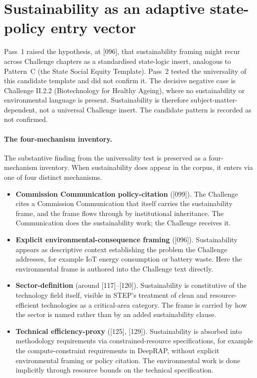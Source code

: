 \section{Sustainability as an adaptive state-policy entry vector}
\label{sec:res-sustainability}

Pass~1 raised the hypothesis, at [096], that sustainability framing
might recur across Challenge chapters as a standardised state-logic
insert, analogous to Pattern~C (the State Social Equity Template).
Pass~2 tested the universality of this candidate template and did not
confirm it. The decisive negative case is Challenge II.2.2
(Biotechnology for Healthy Ageing), where no sustainability or
environmental language is present. Sustainability is therefore
subject-matter-dependent, not a universal Challenge insert. The
candidate pattern is recorded as not confirmed.

\paragraph{The four-mechanism inventory.}
The substantive finding from the universality test is preserved as a
four-mechanism inventory. When sustainability does appear in the
corpus, it enters via one of four distinct mechanisms.

\begin{itemize}[leftmargin=*]
  \item \textbf{Commission Communication policy-citation} ([099]).
    The Challenge cites a Commission Communication that itself
    carries the sustainability frame, and the frame flows through by
    institutional inheritance. The Communication does the
    sustainability work; the Challenge receives it.
  \item \textbf{Explicit environmental-consequence framing} ([096]).
    Sustainability appears as descriptive context establishing the
    problem the Challenge addresses, for example IoT energy
    consumption or battery waste. Here the environmental frame is
    authored into the Challenge text directly.
  \item \textbf{Sector-definition} (around [117]--[120]).
    Sustainability is constitutive of the technology field itself,
    visible in STEP's treatment of clean and resource-efficient
    technologies as a critical-area category. The frame is carried
    by how the sector is named rather than by an added
    sustainability clause.
  \item \textbf{Technical efficiency-proxy} ([125], [129]).
    Sustainability is absorbed into methodology requirements via
    constrained-resource specifications, for example the
    compute-constraint requirements in DeepRAP, without explicit
    environmental framing or policy citation. The environmental
    work is done implicitly through resource bounds on the
    technical specification.
\end{itemize}

